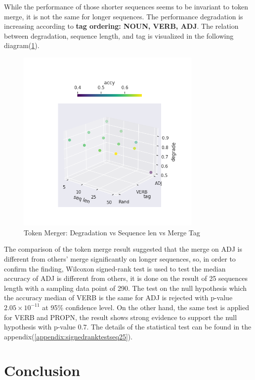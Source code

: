 \documentclass[12pt]{article}
\begin{document}
While the performance of those shorter sequences seems to be invariant to token merge, it is not the same for longer sequences. The performance degradation is increasing according to \textbf{tag ordering: NOUN, VERB, ADJ}. The relation between degradation, sequence length, and tag is visualized in the following diagram(\ref{fig:mergeScatter}).
\begin{figure} [!h]
\begin{center}
\includegraphics[width=0.8\textwidth]{figures/tokenmerg1.png}
\caption{Token Merger: Degradation vs Sequence len vs Merge Tag}
\label{fig:mergeScatter}
\end{center}
\end{figure}
The comparison of the token merge result suggested that the merge on ADJ is different from others' merge significantly on longer sequences, so, in order to confirm the finding, Wilcoxon signed-rank test is used to test the median accuracy of ADJ is different from others, it is done on the result of 25 sequences length with a sampling data point of 290. 
The test on the null hypothesis which the accuracy median of VERB is the same for ADJ is rejected with p-value $2.05\times10^{-11}$ at 95\% confidence level. On the other hand, the same test is applied for VERB and PROPN, the result shows strong evidence to support the null hypothesis with p-value $0.7$. The details of the statistical test can be found in the appendix(\ref{appendix:signedranktestseq25}). 




\clearpage
\section{Conclusion}
\end{document}
